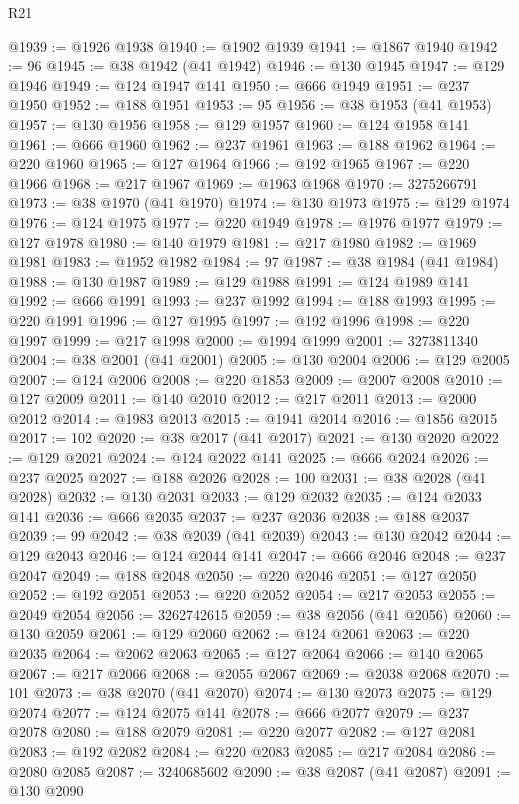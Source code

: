\begin{lexlean}{R21}
\begin{coremodule}
@1939 := @1926 @1938
@1940 := @1902 @1939
@1941 := @1867 @1940
@1942 := 96
@1945 := @38 @1942 (@41 @1942)
@1946 := @130 @1945
@1947 := @129 @1946
@1949 := @124 @1947 @141
@1950 := @666 @1949
@1951 := @237 @1950
@1952 := @188 @1951
@1953 := 95
@1956 := @38 @1953 (@41 @1953)
@1957 := @130 @1956
@1958 := @129 @1957
@1960 := @124 @1958 @141
@1961 := @666 @1960
@1962 := @237 @1961
@1963 := @188 @1962
@1964 := @220 @1960
@1965 := @127 @1964
@1966 := @192 @1965
@1967 := @220 @1966
@1968 := @217 @1967
@1969 := @1963 @1968
@1970 := 3275266791
@1973 := @38 @1970 (@41 @1970)
@1974 := @130 @1973
@1975 := @129 @1974
@1976 := @124 @1975
@1977 := @220 @1949
@1978 := @1976 @1977
@1979 := @127 @1978
@1980 := @140 @1979
@1981 := @217 @1980
@1982 := @1969 @1981
@1983 := @1952 @1982
@1984 := 97
@1987 := @38 @1984 (@41 @1984)
@1988 := @130 @1987
@1989 := @129 @1988
@1991 := @124 @1989 @141
@1992 := @666 @1991
@1993 := @237 @1992
@1994 := @188 @1993
@1995 := @220 @1991
@1996 := @127 @1995
@1997 := @192 @1996
@1998 := @220 @1997
@1999 := @217 @1998
@2000 := @1994 @1999
@2001 := 3273811340
@2004 := @38 @2001 (@41 @2001)
@2005 := @130 @2004
@2006 := @129 @2005
@2007 := @124 @2006
@2008 := @220 @1853
@2009 := @2007 @2008
@2010 := @127 @2009
@2011 := @140 @2010
@2012 := @217 @2011
@2013 := @2000 @2012
@2014 := @1983 @2013
@2015 := @1941 @2014
@2016 := @1856 @2015
@2017 := 102
@2020 := @38 @2017 (@41 @2017)
@2021 := @130 @2020
@2022 := @129 @2021
@2024 := @124 @2022 @141
@2025 := @666 @2024
@2026 := @237 @2025
@2027 := @188 @2026
@2028 := 100
@2031 := @38 @2028 (@41 @2028)
@2032 := @130 @2031
@2033 := @129 @2032
@2035 := @124 @2033 @141
@2036 := @666 @2035
@2037 := @237 @2036
@2038 := @188 @2037
@2039 := 99
@2042 := @38 @2039 (@41 @2039)
@2043 := @130 @2042
@2044 := @129 @2043
@2046 := @124 @2044 @141
@2047 := @666 @2046
@2048 := @237 @2047
@2049 := @188 @2048
@2050 := @220 @2046
@2051 := @127 @2050
@2052 := @192 @2051
@2053 := @220 @2052
@2054 := @217 @2053
@2055 := @2049 @2054
@2056 := 3262742615
@2059 := @38 @2056 (@41 @2056)
@2060 := @130 @2059
@2061 := @129 @2060
@2062 := @124 @2061
@2063 := @220 @2035
@2064 := @2062 @2063
@2065 := @127 @2064
@2066 := @140 @2065
@2067 := @217 @2066
@2068 := @2055 @2067
@2069 := @2038 @2068
@2070 := 101
@2073 := @38 @2070 (@41 @2070)
@2074 := @130 @2073
@2075 := @129 @2074
@2077 := @124 @2075 @141
@2078 := @666 @2077
@2079 := @237 @2078
@2080 := @188 @2079
@2081 := @220 @2077
@2082 := @127 @2081
@2083 := @192 @2082
@2084 := @220 @2083
@2085 := @217 @2084
@2086 := @2080 @2085
@2087 := 3240685602
@2090 := @38 @2087 (@41 @2087)
@2091 := @130 @2090

\end{coremodule}
\end{lexlean}
